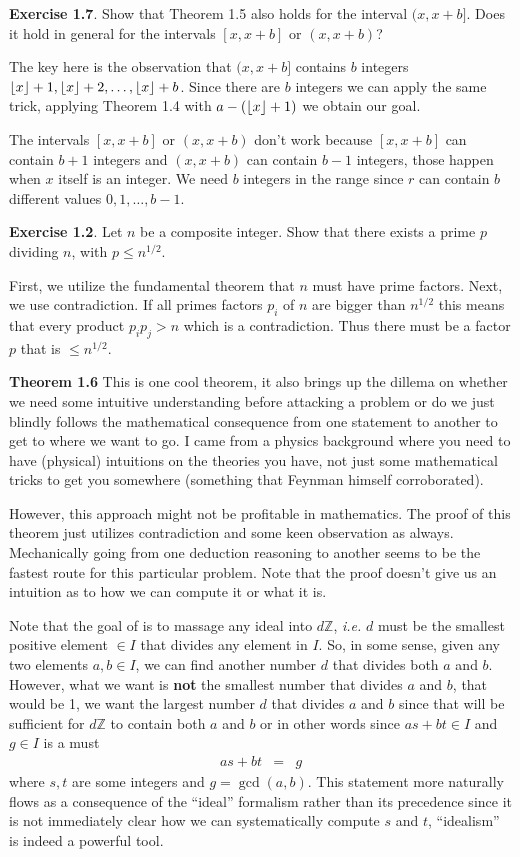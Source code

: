 \documentclass[aps,preprint,preprintnumbers,nofootinbib,showpacs,prd]{revtex4-1}
\newcommand{\ie}{{\it i.e.} }
\newcommand{\nbea}{\begin{eqnarray*}}
\newcommand{\neea}{\end{eqnarray*}}
\DeclarePairedDelimiter{\floor}{\lfloor}{\rfloor}
\begin{document}
{\bf Exercise 1.7}. Show that Theorem 1.5 also holds for the interval $(x,x+b]$. Does  it hold in general for the intervals $[x,x+b]$ or $(x,x+b)$?

The key here is the observation that $(x,x+b]$ contains $b$ integers $\floor{x}+1, \floor{x}+2, \dots , \floor{x}+b$. Since there are $b$ integers we can apply the same trick, applying Theorem 1.4 with $a - (\floor{x} + 1)$ we obtain our goal.

The intervals $[x,x+b]$ or $(x,x+b)$ don't work because $[x,x+b]$ can contain $b+1$ integers and $(x,x+b)$ can contain $b-1$ integers, those happen when $x$ itself is an integer. We need $b$ integers in the range since $r$ can contain $b$ different values $0,1,\dots,b-1$.

{\bf Exercise 1.2}. Let $n$ be a composite integer. Show that there exists a prime $p$ dividing $n$, with $p \le n^{1/2}$.

First, we utilize the fundamental theorem that $n$ must have prime factors. Next, we use contradiction. If all primes factors $p_i$ of $n$ are bigger than $n^{1/2}$ this means that every product $p_i p_j > n$ which is a contradiction. Thus there must be a factor $p$ that is $\le n^{1/2}$.

{\bf Theorem 1.6} This is one cool theorem, it also brings up the dillema on whether we need some intuitive understanding before attacking a problem or do we just blindly follows the mathematical consequence from one statement to another to get to where we want to go. I came from a physics background where you need to have (physical) intuitions on the theories you have, not just some mathematical tricks to get you somewhere (something that Feynman himself corroborated).

However, this approach might not be profitable in mathematics. The proof of this theorem just utilizes contradiction and some keen observation as always. Mechanically going from one deduction reasoning to another seems to be the fastest route for this particular problem. Note that the proof doesn't give us an intuition as to how we can compute it or what it is. 

Note that the goal of is to massage any ideal into $d\mathbb{Z}$, \ie $d$ must be the smallest positive element $\in I$ that divides any element in $I$. So, in some sense, given any two elements $a,b \in I$, we can find another number $d$ that divides both $a$ and $b$. However, what we want is {\bf not} the smallest number that divides $a$ and $b$, that would be 1, we want the largest number $d$ that divides $a$ and $b$ since that will be sufficient for $d\mathbb{Z}$ to contain both $a$ and $b$ or in other words since $a s + b t \in I$ and $g \in I$ is a must
%
\nbea
a s + b t & = & g
\neea
%
where $s,t$ are some integers and $g = \gcd(a,b)$. This statement more naturally flows as a consequence of the ``ideal'' formalism rather than its precedence since it is not immediately clear how we can systematically compute $s$ and $t$, ``idealism'' is indeed a powerful tool.
\end{document}

